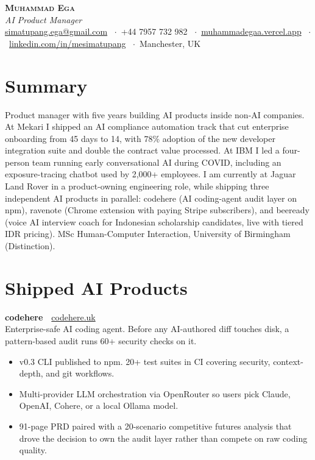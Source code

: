\documentclass[11pt,a4paper]{article}
\newcommand{\dotsep}{\ {\small$\cdot$}\ }
\begin{document}
\begin{center}
  {\Huge\bfseries\scshape Muhammad Ega}\\[0.25em]
  {\large\itshape AI Product Manager}\\[0.5em]
  \small
  \href{mailto:simatupang.ega@gmail.com}{simatupang.ega@gmail.com}
  \dotsep +44 7957 732 982
  \dotsep \href{https://muhammadegaa.vercel.app}{muhammadegaa.vercel.app}
  \dotsep \href{https://linkedin.com/in/mesimatupang}{linkedin.com/in/mesimatupang}
  \dotsep Manchester, UK
\end{center}

\section*{Summary}

Product manager with five years building AI products inside non-AI companies. At Mekari I shipped an AI compliance automation track that cut enterprise onboarding from 45 days to 14, with 78\% adoption of the new developer integration suite and double the contract value processed. At IBM I led a four-person team running early conversational AI during COVID, including an exposure-tracing chatbot used by 2{,}000+ employees. I am currently at Jaguar Land Rover in a product-owning engineering role, while shipping three independent AI products in parallel: codehere (AI coding-agent audit layer on npm), ravenote (Chrome extension with paying Stripe subscribers), and beeready (voice AI interview coach for Indonesian scholarship candidates, live with tiered IDR pricing). MSc Human-Computer Interaction, University of Birmingham (Distinction).

\section*{Shipped AI Products}

\noindent\textbf{codehere}\ \ \href{https://codehere.uk}{codehere.uk}\\
Enterprise-safe AI coding agent. Before any AI-authored diff touches disk, a pattern-based audit runs 60+ security checks on it.
\begin{itemize}
  \item v0.3 CLI published to npm. 20+ test suites in CI covering security, context-depth, and git workflows.
  \item Multi-provider LLM orchestration via OpenRouter so users pick Claude, OpenAI, Cohere, or a local Ollama model.
  \item 91-page PRD paired with a 20-scenario competitive futures analysis that drove the decision to own the audit layer rather than compete on raw coding quality.
\end{itemize}
\end{document}
